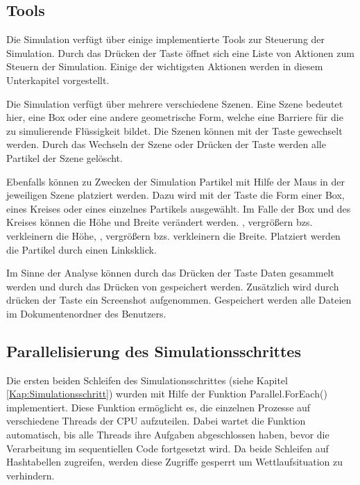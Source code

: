 \documentclass[a4paper, 12pt]{article}
\begin{document}
\subsection{Tools}
Die Simulation verfügt über einige implementierte Tools zur Steuerung der Simulation. Durch das Drücken der Taste  öffnet sich eine Liste von Aktionen zum Steuern der Simulation. Einige der wichtigsten Aktionen werden in diesem Unterkapitel vorgestellt. 

Die Simulation verfügt über mehrere verschiedene \glqq Szenen\grqq{}. Eine \glqq Szene\grqq{} bedeutet hier, eine Box oder eine andere geometrische Form, welche eine Barriere für die zu simulierende Flüssigkeit bildet. Die Szenen können mit der Taste  gewechselt werden. Durch das Wechseln der Szene oder Drücken der Taste  werden alle Partikel der Szene gelöscht. 

Ebenfalls können zu Zwecken der Simulation Partikel mit Hilfe der Maus in der jeweiligen Szene platziert werden. Dazu wird mit der Taste  die Form einer Box, eines Kreises oder eines einzelnes Partikels
ausgewählt. Im Falle der Box und des Kreises können die Höhe und Breite verändert werden. ,  vergrößern bzs. verkleinern die Höhe, , vergrößern bzs. verkleinern die Breite. Platziert werden die Partikel durch einen Linksklick.

Im Sinne der Analyse können durch das Drücken der Taste  Daten gesammelt werden und durch das Drücken von  gespeichert werden. Zusätzlich wird durch drücken der Taste  ein Screenshot aufgenommen. Gespeichert werden alle Dateien im Dokumentenordner des Benutzers.

\subsection{Parallelisierung des Simulationsschrittes}
Die ersten beiden Schleifen des Simulationsschrittes (siehe Kapitel \ref{Kap:Simulationsschritt}) wurden mit Hilfe der Funktion Parallel.ForEach() implementiert. Diese Funktion ermöglicht es, die einzelnen Prozesse auf verschiedene Threads der CPU aufzuteilen. Dabei wartet die Funktion automatisch, bis alle Threads ihre Aufgaben abgeschlossen haben, bevor die Verarbeitung im sequentiellen Code fortgesetzt wird. Da beide Schleifen auf Hashtabellen zugreifen, werden diese Zugriffe gesperrt um Wettlaufsituation zu verhindern.  
\end{document}
